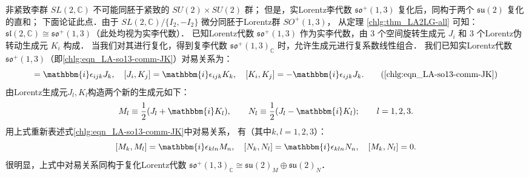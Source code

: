 {\kaishu 非紧致}李群 $SL(2,\mathbb{C})$ 不可能同胚于{\kaishu 紧致}的 $SU(2)\times SU(2)$ 群；
但是，实Lorentz李代数 $\mathfrak{so}^{+}(1,3)$ 复化后，同构于两个 $\mathfrak{su}(2)$ 复化的直和；
下面论证此点．由于 $SL(2,\mathbb{C})/\{I_2,-I_2\}$ 微分同胚于Lorentz群 $SO^{+}(1,3)$，
从定理 \ref{chlg:thm_LA2LG-all} 可知：$\mathfrak{sl}(2,\mathbb{C}) \cong \mathfrak{so}^{+}(1,3)$（此处均视为实李代数）．
已知Lorentz代数 $\mathfrak{so}^{+}(1,3)$ 作为实李代数，由 3 个空间旋转生成元 $J_i$ 和 3 个Lorentz伪转动生成元 $K_i$ 构成．
当我们对其进行复化，得到复李代数 $\mathfrak{so}^{+}(1,3)_{\mathbb{C}}$ 时，允许生成元进行复系数线性组合．
我们已知实Lorentz代数$\mathfrak{so}^{+}(1,3)$（即\eqref{chlg:eqn_LA-so13-comm-JK}）对易关系为：
\begin{equation}
	[J_i, J_j] = \mathbbm{i} \epsilon_{ijk} J_k,\quad
	[J_i, K_j] = \mathbbm{i} \epsilon_{ijk} K_k,\quad
	[K_i, K_j] = -\mathbbm{i}\epsilon_{ijk} J_k.
	\tag{\ref{chlg:eqn_LA-so13-comm-JK}}
\end{equation}
由Lorentz生成元$J_l,K_l$构造两个新的生成元如下：
\begin{equation}\label{chlar:eqn_new-so13}
	M_l \equiv \frac{1}{2}(J_l + \mathbbm{i} K_l ), \qquad
	N_l \equiv \frac{1}{2}(J_l - \mathbbm{i} K_l ); \qquad l=1,2,3.
\end{equation}
用上式重新表述式\eqref{chlg:eqn_LA-so13-comm-JK}中对易关系，
有（其中$k,l = 1,2,3$）：
\begin{equation}\label{chlar:eqn_new-LA-so13}
	[M_k, M_l] = \mathbbm{i} \epsilon_{kln} M_n, \quad
	[N_k, N_l] = \mathbbm{i} \epsilon_{kln} N_n, \quad
	[M_k, N_l] = 0.
\end{equation}
很明显，上式中对易关系同构于复化Lorentz代数 $\mathfrak{so}^{+}(1,3)_{\mathbb{C}} 
\cong \mathfrak{su}(2)_M \oplus\mathfrak{su}(2)_N$．

